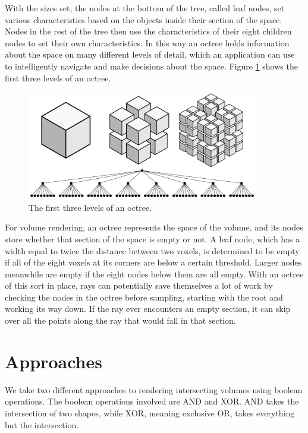 \documentclass{article}
\begin{document}
With the sizes set, the nodes at the bottom of the tree, called leaf nodes, set
various characteristics based on the objects inside their section of the space.
Nodes in the rest of the tree then use the characteristics of their eight
children nodes to set their own characteristics.  In this way an octree holds
information about the space on many different levels of detail, which an
application can use to intelligently navigate and make decisions about the
space.  Figure \ref{octree} shows the first three levels of an octree.

\begin{figure}
\centering
\includegraphics[width=0.9\textwidth]{octree.pdf}
\caption{The first three levels of an octree.}
\label{octree}
\end{figure}

For volume rendering, an octree represents the space of the volume, and its
nodes store whether that section of the space is empty or not.  A leaf node,
which has a width equal to twice the distance between two voxels, is determined
to be empty if all of the eight voxels at its corners are below a certain
threshold.  Larger nodes meanwhile are empty if the eight nodes below them are
all empty.  With an octree of this sort in place, rays can potentially save
themselves a lot of work by checking the nodes in the octree before sampling,
starting with the root and working its way down.  If the ray ever encounters an
empty section, it can skip over all the points along the ray that would fall in
that section.

\section{Approaches}

We take two different approaches to rendering intersecting volumes using boolean
operations.  The boolean operations involved are AND and XOR.  AND takes the
intersection of two shapes, while XOR, meaning exclusive OR, takes everything
but the intersection.
\end{document}
